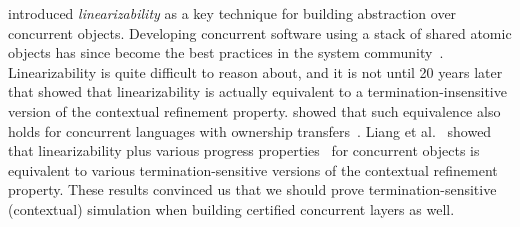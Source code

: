  \cite{herlihy90} introduced {\em linearizability} as a key technique
 for building abstraction over concurrent objects. Developing
 concurrent software using a stack of shared atomic objects has since
 become the best practices in the system
 community~\cite{Herlihy08book,ospp11}. Linearizability is quite
 difficult to reason about, and it is not until 20 years later that
 \cite{filipovic10} showed that linearizability is actually equivalent
 to a termination-insensitive version of the contextual refinement
 property. \cite{Gotsman12concur} showed that such equivalence also
 holds for concurrent languages with ownership
 transfers~\cite{ohearn:concur04}.  Liang et al.~\cite{liang13,lili16} showed that linearizability plus various
 progress properties~\cite{Herlihy08book} for concurrent objects is
 equivalent to various termination-sensitive versions of the contextual
 refinement property. These results convinced us that we should prove
 termination-sensitive (contextual) simulation when building certified
 concurrent layers as well.

